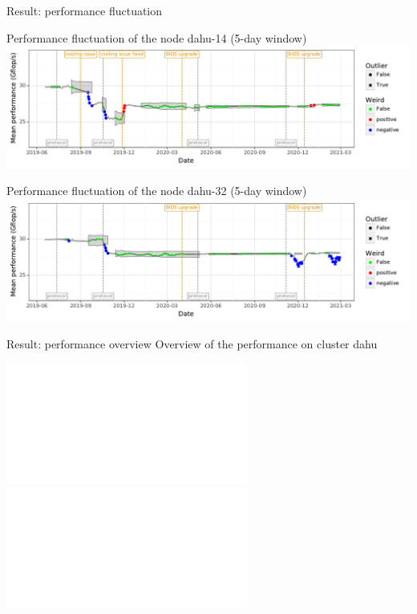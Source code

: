 \documentclass[10pt]{beamer}
\begin{document}
\begin{frame}{Result: performance fluctuation}
    \begin{center}
        \begin{minipage}[t][.4\textheight][t]{\textwidth}
            Performance fluctuation of the node dahu-14 (5-day window)\\
            \includegraphics[width=0.9\linewidth]{img/slides/evolution_dahu-14_windowed.pdf}
        \end{minipage}
        \begin{minipage}[t][.4\textheight][t]{\textwidth}
            Performance fluctuation of the node dahu-32 (5-day window)\\
            \includegraphics[width=0.9\linewidth]{img/slides/evolution_dahu-32_windowed.pdf}
        \end{minipage}
    \end{center}
\end{frame}

\begin{frame}{Result: performance overview}
    Overview of the performance on cluster dahu \\
    \begin{center}
        \includegraphics<1>[width=0.9\linewidth]{img/slides/overview_dahu.pdf}
        \includegraphics<2>[width=0.9\linewidth]{img/slides/overview_windowed_dahu.pdf}
    \end{center}
\end{frame}
\end{document}
